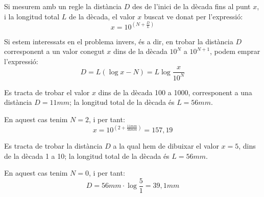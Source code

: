 Si mesurem amb un regle la dist\`{a}ncia $D$ des de l'inici de la d\`{e}cada fins al punt $x$, i
la longitud total $L$ de la d\`{e}cada, el valor $x$ buscat ve donat per l'expressi\'{o}:
\begin{equation}
    x = 10^{\left(N+\frac{D}{L}\right)}
\end{equation}

Si estem interessats en el problema invers, \'{e}s a dir, en  trobar la dist\`{a}ncia $D$
corresponent a un valor conegut $x$ dins de la d\`{e}cada $10^N$ a $10^{N+1}$, podem emprar
l'expressi\'{o}:
\begin{equation}
    D = L(\log x - N) = L \log\frac{x}{10^N}
\end{equation}

\begin{exemple}
Es tracta de trobar el valor $x$ dins de la d\`{e}cada 100 a 1000, corresponent a una
dist\`{a}ncia $D=11\unit{mm}$; la longitud total de la d\`{e}cada \'{e}s $L=56\unit{mm}$.

En aquest cas tenim $N=2$, i per tant:
\[
    x = 10^{\left(2+\frac{11\unit{mm}}{56\unit{mm}}\right)}= 157{,}19
\]
\end{exemple}

\begin{exemple}
Es tracta de trobar la dist\`{a}ncia $D$ a la qual hem de dibuixar el valor $x=5$, dins de la
d\`{e}cada 1 a 10; la longitud total de la d\`{e}cada \'{e}s $L=56\unit{mm}$.

En aquest cas tenim $N=0$, i per tant:
\[
    D = 56\unit{mm} \cdot \log \frac{5}{1}  = 39{,}1\unit{mm}
\]
\end{exemple}

